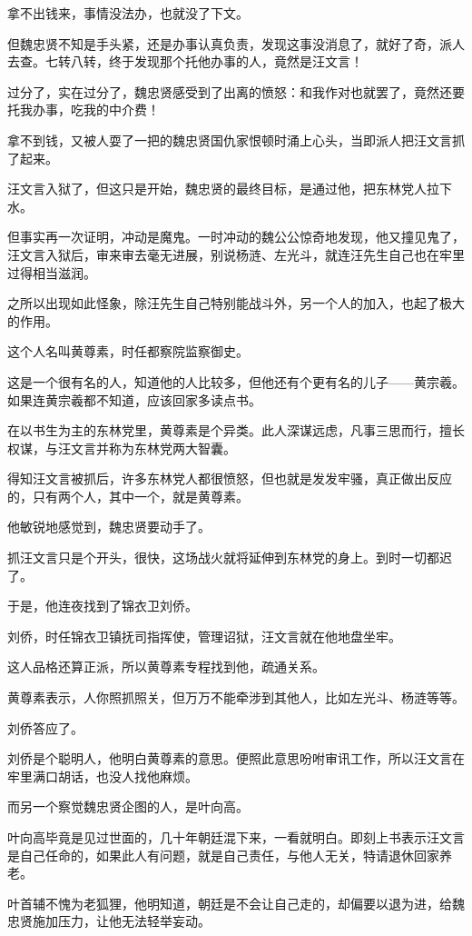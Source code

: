 \begin{multicols}{\theparacolNo}
拿不出钱来，事情没法办，也就没了下文。

但魏忠贤不知是手头紧，还是办事认真负责，发现这事没消息了，就好了奇，派人去查。七转八转，终于发现那个托他办事的人，竟然是汪文言！

过分了，实在过分了，魏忠贤感受到了出离的愤怒：和我作对也就罢了，竟然还要托我办事，吃我的中介费！

拿不到钱，又被人耍了一把的魏忠贤国仇家恨顿时涌上心头，当即派人把汪文言抓了起来。

汪文言入狱了，但这只是开始，魏忠贤的最终目标，是通过他，把东林党人拉下水。

但事实再一次证明，冲动是魔鬼。一时冲动的魏公公惊奇地发现，他又撞见鬼了，汪文言入狱后，审来审去毫无进展，别说杨涟、左光斗，就连汪先生自己也在牢里过得相当滋润。

之所以出现如此怪象，除汪先生自己特别能战斗外，另一个人的加入，也起了极大的作用。

这个人名叫黄尊素，时任都察院监察御史。

这是一个很有名的人，知道他的人比较多，但他还有个更有名的儿子——黄宗羲。如果连黄宗羲都不知道，应该回家多读点书。

在以书生为主的东林党里，黄尊素是个异类。此人深谋远虑，凡事三思而行，擅长权谋，与汪文言并称为东林党两大智囊。

得知汪文言被抓后，许多东林党人都很愤怒，但也就是发发牢骚，真正做出反应的，只有两个人，其中一个，就是黄尊素。

他敏锐地感觉到，魏忠贤要动手了。

抓汪文言只是个开头，很快，这场战火就将延伸到东林党的身上。到时一切都迟了。

于是，他连夜找到了锦衣卫刘侨。

刘侨，时任锦衣卫镇抚司指挥使，管理诏狱，汪文言就在他地盘坐牢。

这人品格还算正派，所以黄尊素专程找到他，疏通关系。

黄尊素表示，人你照抓照关，但万万不能牵涉到其他人，比如左光斗、杨涟等等。

刘侨答应了。

刘侨是个聪明人，他明白黄尊素的意思。便照此意思吩咐审讯工作，所以汪文言在牢里满口胡话，也没人找他麻烦。

而另一个察觉魏忠贤企图的人，是叶向高。

叶向高毕竟是见过世面的，几十年朝廷混下来，一看就明白。即刻上书表示汪文言是自己任命的，如果此人有问题，就是自己责任，与他人无关，特请退休回家养老。

叶首辅不愧为老狐狸，他明知道，朝廷是不会让自己走的，却偏要以退为进，给魏忠贤施加压力，让他无法轻举妄动。


\end{multicols}

